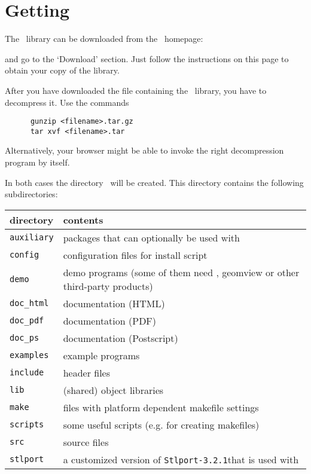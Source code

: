 \section{Getting \cgal} \label{sec:gettingcgal}

The \cgal\ library can be downloaded from the \cgal\ 
homepage:
\begin{quote}
      \cgalhomepage
\end{quote}
and go to the `Download' section. Just follow the instructions on this
page to obtain your copy of the library.

After you have downloaded the file containing the \cgal\ library, you
have to decompress it. Use the commands

\begin{verbatim}
      gunzip <filename>.tar.gz
      tar xvf <filename>.tar
\end{verbatim}

Alternatively, your browser might be able to invoke the right
decompression program by itself.

In both cases the directory \cgaldir\ will be created. This directory
contains the following subdirectories:\index{directories!structure}

\footnotetext[14]{\stlportpage}\addtocounter{footnote}{1}
\begin{center}
  \renewcommand{\arraystretch}{1.3}
  \gdef\lcTabularBorder{2}
  \begin{tabular}{|l|l|} \hline
    \textbf{directory} & \textbf{contents}\\\hline\hline
    \texttt{auxiliary} & packages that can optionally be used with \cgal\\\hline
    \texttt{config}    & configuration files for install script\\\hline
    \texttt{demo}      & demo programs (some of them need \leda, geomview
                         or other third-party products)\\\hline
    \texttt{doc\_html} & documentation (HTML)\\\hline
    \texttt{doc\_pdf}  & documentation (PDF)\\\hline
    \texttt{doc\_ps}   & documentation (Postscript)\\\hline
    \texttt{examples}  & example programs\\\hline
    \texttt{include}   & header files\\\hline
    \texttt{lib}       & (shared) object libraries\\\hline
    \texttt{make}      & files with platform dependent makefile settings\\\hline
    \texttt{scripts}   & some useful scripts (e.g. for creating makefiles)\\\hline
    \texttt{src}       & source files\\\hline
    \texttt{stlport}   & 
         a customized version of \texttt{Stlport-3.2.1}\footnotemark[14] 
         that is used with \msvc{6.0}\\\hline
  \end{tabular}
\end{center}

